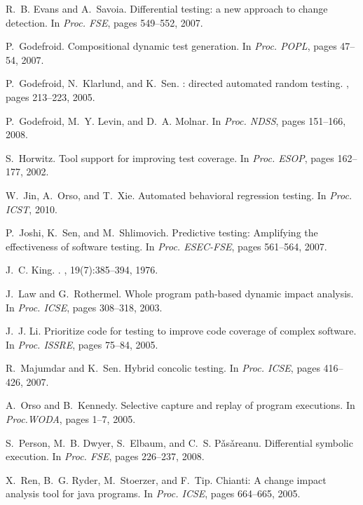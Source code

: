 \documentclass{llncs}
\begin{document}
\begin{thebibliography}{10}
\begin{scriptsize}
R.~B. Evans and A.~Savoia.
\newblock Differential testing: a new approach to change detection.
\newblock In {\em Proc. FSE}, pages 549--552, 2007.

P.~Godefroid.
\newblock Compositional dynamic test generation.
\newblock In {\em Proc. POPL}, pages 47--54, 2007.

P.~Godefroid, N.~Klarlund, and K.~Sen.
: directed automated random testing.
, pages 213--223, 2005.

P.~Godefroid, M.~Y. Levin, and D.~A. Molnar.
\newblock In {\em Proc. NDSS}, pages 151--166, 2008.

S.~Horwitz.
\newblock Tool support for improving test coverage.
\newblock In {\em Proc. ESOP}, pages 162--177, 2002.

W.~Jin, A.~Orso, and T.~Xie.
\newblock Automated behavioral regression testing.
\newblock In {\em Proc. ICST}, 2010.

P.~Joshi, K.~Sen, and M.~Shlimovich.
\newblock Predictive testing: Amplifying the effectiveness of software testing.
\newblock In {\em Proc. ESEC-FSE}, pages 561--564, 2007.

J.~C. King.
.
, 19(7):385--394, 1976.

J.~Law and G.~Rothermel.
\newblock Whole program path-based dynamic impact analysis.
\newblock In {\em Proc. ICSE}, pages 308--318, 2003.

J.~J. Li.
\newblock Prioritize code for testing to improve code coverage of complex
  software.
\newblock In {\em Proc. ISSRE}, pages 75--84, 2005.

R.~Majumdar and K.~Sen.
\newblock Hybrid concolic testing.
\newblock In {\em Proc. ICSE}, pages 416--426, 2007.

A.~Orso and B.~Kennedy.
\newblock Selective capture and replay of program executions.
\newblock In {\em Proc.WODA}, pages 1--7, 2005.

S.~Person, M.~B. Dwyer, S.~Elbaum, and C.~S. P\v{a}s\v{a}reanu.
\newblock Differential symbolic execution.
\newblock In {\em Proc. FSE}, pages 226--237, 2008.

X.~Ren, B.~G. Ryder, M.~Stoerzer, and F.~Tip.
\newblock Chianti: A change impact analysis tool for java programs.
\newblock In {\em Proc. ICSE}, pages 664--665, 2005.


\end{scriptsize}
\end{thebibliography}
\end{document}
